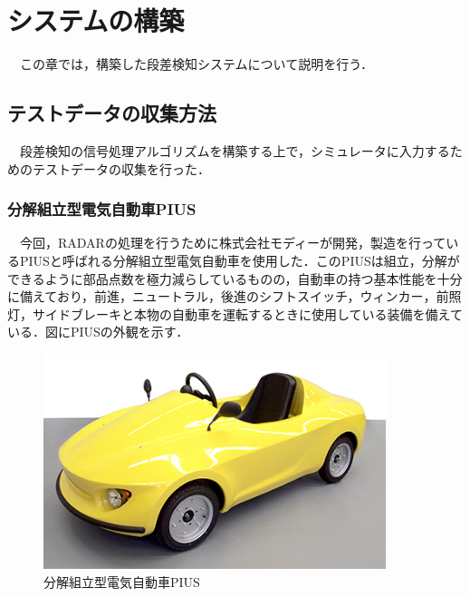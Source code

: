 \chapter{システムの構築}
　この章では，構築した段差検知システムについて説明を行う．

\section{テストデータの収集方法}
　段差検知の信号処理アルゴリズムを構築する上で，シミュレータに入力するためのテストデータの収集を行った．

\subsection{分解組立型電気自動車PIUS}
　今回，RADARの処理を行うために株式会社モディーが開発，製造を行っているPIUSと呼ばれる分解組立型電気自動車を使用した．このPIUSは組立，分解ができるように部品点数を極力減らしているものの，自動車の持つ基本性能を十分に備えており，前進，ニュートラル，後進のシフトスイッチ，ウィンカー，前照灯，サイドブレーキと本物の自動車を運転するときに使用している装備を備えている\cite{PIUS}．図にPIUSの外観を示す．
\begin{figure}[H]
    \centering
    \includegraphics[width=10cm]{./fig/PIUS.png}
    \caption{分解組立型電気自動車PIUS\cite{PIUS}}
    \label{fig:PIUS}
\end{figure}


